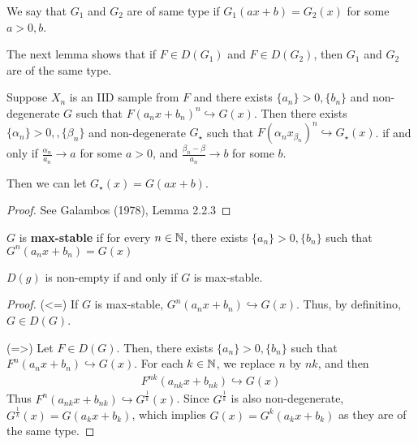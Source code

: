 We say that $G_{1}$ and $G_{2}$ are of same type if $G_{1}(ax + b) =
G_{2}(x)$ for some $a > 0, b$.

The next lemma shows that if $F \in D(G_{1})$ and $F \in D(G_{2})$,
then $G_{1}$ and $G_{2}$ are of the same type.

\begin{lem}
  Suppose $X_{n}$ is an IID sample from $F$ and there exists $\{ a_{n}
  \} > 0, \{ b_{n} \}$ and non-degenerate $G$ such that $F(a_{n} x
  +b_{n})^{n} \hookrightarrow G(x)$. Then there exists $\{ \alpha_{n}
  \} > 0, , \{ \beta_{n} \}$ and non-degenerate $G_{\star}$ such that
  $F(\alpha_{n} x _{ \beta_{n}})^{n} \hookrightarrow G_{\star}(x)$. if
  and only if $\frac{\alpha_{n}}{a_{n}} \rightarrow a$ for some $a >
  0$, and $\frac{\beta_{n} - \beta}{a_{n}} \rightarrow b$ for some
  $b$.

Then we can let $G_{\star}(x) = G(ax + b)$.
\end{lem}

\begin{proof}
  See Galambos (1978), Lemma 2.2.3
\end{proof}

\begin{defn}
  \label{defn:extreme_value_theory:1}
  $G$ is \textbf{max-stable} if for every $n \in \mathbb{N}$, there exists
  $\{ a_{n} \} > 0, \{ b_{n} \} $ such that $G^{n}(a_{n}x + b_{n}) = G(x)$
\end{defn}

\begin{thm}
  \label{defn:extreme_value_theory:2}
  $D(g)$ is non-empty if and only if $G$ is max-stable.
\end{thm}

\begin{proof}
  (<=) If $G$ is max-stable, $G^{n}(a_{n} x + b_{n}) \hookrightarrow
  G(x)$.  Thus, by definitino, $G \in D(G)$.

  (=>) Let $F \in D(G)$. Then, there exists $\{ a_{n} \} > 0, \{ b_{n}
  \}$ such that $F^{n}(a_{n} x + b_{n}) \hookrightarrow G(x)$.  For
  each $k \in \mathbb{N}$, we replace $n$ by $nk$, and then
  \begin{align}
    \label{eq:121}
    F^{nk}(a_{nk} x + b_{nk}) \hookrightarrow G(x)
  \end{align}
  Thus $F^{n}(a_{nk} x + b_{nk}) \hookrightarrow G^{\frac{1}{k}}(x)$.
  Since $G^{\frac{1}{k}}$ is also non-degenerate, $G^{\frac{1}{k}}(x)
  = G(a_{k} x + b_{k})$, which implies $G(x) = G^{k}(a_{k} x + b_{k})$
  as they are of the same type.
\end{proof}

